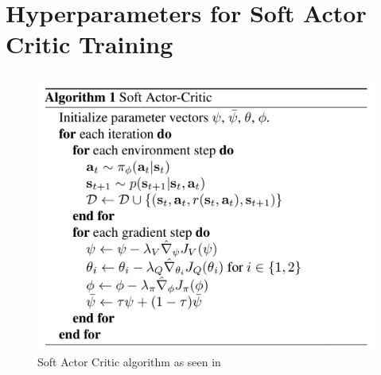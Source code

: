 \section{Hyperparameters for Soft Actor Critic Training}
\subsection{}
  \begin{figure}[H]
      \centering
      \includegraphics[width=1\textwidth / 2]{figures/external/sac_algorithm.png}
      \caption{Soft Actor Critic algorithm as seen in \cite{haarnoja2018soft}}
      \label{fig:sac_algorithm}
  \end{figure}



